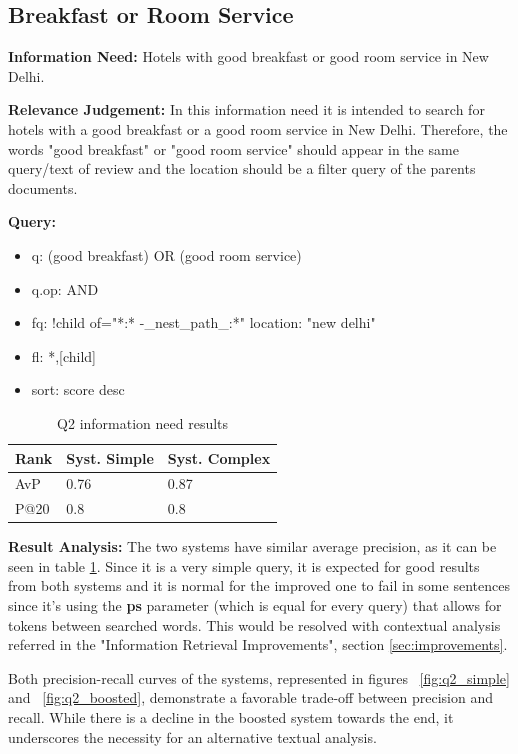 \documentclass[sigconf]{acmart}
\begin{document}
\subsection{Breakfast or Room Service}


\textbf{Information Need:} Hotels with good breakfast or good room service in New Delhi.

\textbf{Relevance Judgement:} In this information need it is intended to search for hotels with a good breakfast or a good room service in New Delhi. Therefore, the words "good breakfast" or "good room service" should appear in the same query/text of review and the location should be a filter query of the parents documents.

\textbf{Query:}

\begin{itemize}
    \item q: (good breakfast) OR (good room service)
    \item q.op: AND
    \item fq: {!child of="*:* -\_nest\_path\_:*"} location: "new delhi"
    \item fl: *,[child]
    \item sort: score desc
\end{itemize}

\begin{table}[h]
\caption{Q2 information need results}
\label{tab:q2}
\begin{tabular}{lll}
\toprule
Rank & Syst. Simple & Syst. Complex\\
\midrule
AvP & 0.76 & 0.87  \\
P@20 & 0.8 & 0.8 \\
\bottomrule
\end{tabular}
\end{table}

\textbf{Result Analysis:}\label{ra_q2} The two systems have similar average precision, as it can be seen in table \ref{tab:q2}. Since it is a very simple query, it is expected for good results from both systems and it is normal for the improved one to fail in some sentences since it's using the \textbf{ps} parameter (which is equal for every query) that allows for tokens between searched words. This would be resolved with contextual analysis referred in the "Information Retrieval Improvements", section \ref{sec:improvements}.

Both precision-recall curves of the systems, represented in figures ~\ref{fig:q2_simple} and ~\ref{fig:q2_boosted}, demonstrate a favorable trade-off between precision and recall. While there is a decline in the boosted system towards the end, it underscores the necessity for an alternative textual analysis.
\end{document}
